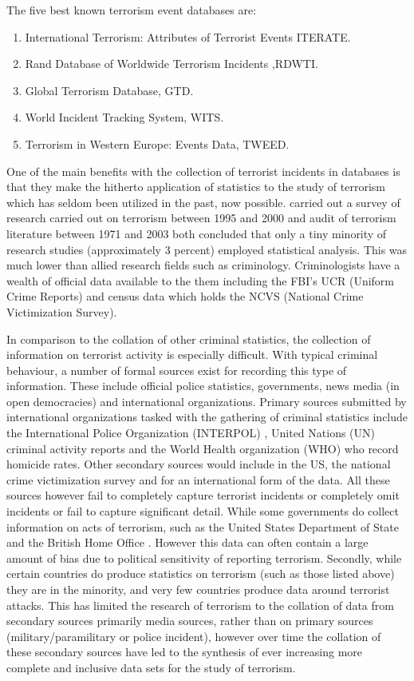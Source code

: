 The five best known terrorism event databases are:
\begin{enumerate}
\item  International Terrorism: Attributes of Terrorist Events ITERATE.
\item Rand Database of Worldwide Terrorism Incidents ,RDWTI.
\item Global Terrorism Database, GTD.
\item World Incident Tracking System, WITS.
\item Terrorism in Western Europe: Events Data, TWEED.
\end{enumerate}

One of the main benefits with the collection of terrorist incidents in databases is that they make the hitherto application of statistics to the study of terrorism which has seldom been utilized in the past, now possible. \citep{silke2001devil} carried out a survey of research carried out on terrorism between 1995 and 2000 and \citep{lum2006counter} audit of terrorism literature between 1971 and 2003 both concluded that only a tiny minority of research studies (approximately 3 percent) employed statistical analysis. This was much lower than allied research fields such as criminology. Criminologists have a wealth of official data available to the them including the FBI's UCR (Uniform Crime Reports) and census data which holds the NCVS (National Crime Victimization Survey).

In comparison to the collation of other criminal statistics, the collection of information on terrorist activity is especially difficult. With typical criminal behaviour, a number of formal sources exist for recording this type of information. These include official police statistics, governments, news media (in open democracies) and  international organizations. Primary sources submitted by international organizations tasked with the gathering of criminal statistics include the International Police Organization (INTERPOL) \citep{bresler1992interpol}, United Nations (UN) criminal activity reports \citep{united2013global} and the World Health organization (WHO) who record homicide rates. Other secondary sources would include in the US, the national crime victimization survey and for an international form of the data. All these sources however fail to completely capture terrorist incidents or completely omit incidents or fail to capture significant detail. While some governments do collect information on acts of terrorism, such as the United States Department of State and the British Home Office \citep{Homeoffice2016}. However this data can often contain a large amount of bias due to political sensitivity of reporting terrorism. Secondly, while certain countries do produce statistics on terrorism (such as those listed above) they are in the minority, and very few countries produce data around terrorist attacks. This has limited the research of terrorism to the collation of data from secondary sources primarily media sources, rather than on primary sources (military/paramilitary or police incident), however over time the collation of these secondary sources have led to the synthesis of ever increasing more complete and inclusive data sets for the study of terrorism.


